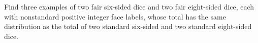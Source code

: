 Find three examples of two fair six-sided dice and two fair eight-sided dice, each with nonstandard positive integer face labels, whose total has the same distribution as the total of two standard six-sided and two standard eight-sided dice.
